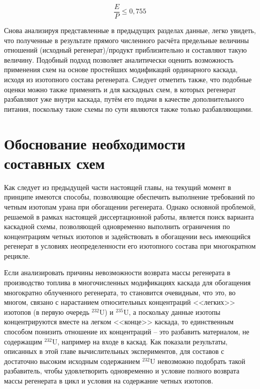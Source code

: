 

\begin{equation}
  \label{eq_232_balance_X_}
    \frac{E}{P} \leq 0,755
\end{equation}


Снова анализируя представленные в предыдущих разделах данные, легко увидеть, что полученные в результате прямого численного расчёта предельные величины отношений (исходный регенерат)/продукт приблизительно и составляют такую величину.
Подобный подход позволяет аналитически оценить возможность применения схем на основе простейших модификаций ординарного каскада, исходя из изотопного состава регенерата. Следует отметить также, что подобные оценки можно также применять и для каскадных схем, в которых регенерат разбавляют уже внутри каскада, путём его подачи в качестве дополнительного питания, поскольку такие схемы по сути являются также только разбавляющими.

\section{Обоснование необходимости составных схем}\label{sec:ch2/sec2}

Как следует из предыдущей части настоящей главы, на текущий момент в принципе имеются способы, позволяющие обеспечить выполнение требований по четным изотопам урана при обогащении регенерата. Однако основной проблемой, решаемой в рамках настоящей диссертационной работы, является поиск варианта каскадной схемы, позволяющей одновременно выполнить ограничения по концентрациям четных изотопов и задействовать в обогащении весь имеющийся регенерат в условиях неопределенности его изотопного состава при многократном рецикле.

Если анализировать причины невозможности возврата массы регенерата в производство топлива в многочисленных модификациях каскада для обогащения многократно облученного регенерата, то становится очевидным, что это, во многом, связано с нарастанием относительных концентраций <<легких>> изотопов (в первую очередь $^{232}$U) и $^{235}$U, а поскольку данные изотопы концентрируются вместе на легком <<конце>> каскада, то единственным способом понизить отношение их концентраций -- это разбавить материалом, не содержащим $^{232}$U, например на входе в каскад. Как показали результаты, описанных в этой главе вычислительных экспериментов, для составов с достаточно высоким исходным содержанием $^{232}$U невозможно подобрать такой разбавитель, чтобы удовлетворить одновременно и условие полного возврата массы регенерата в цикл и условия на содержание четных изотопов.

